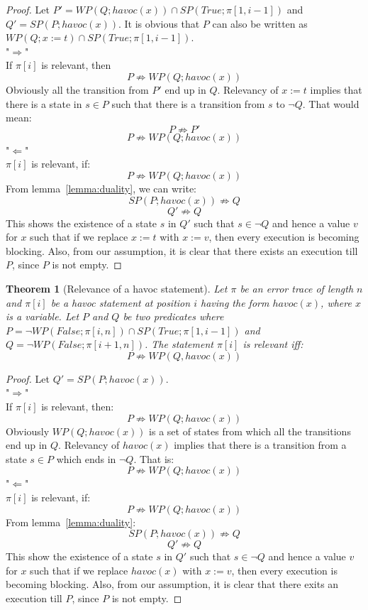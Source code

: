 \documentclass{article}
\newcommand{\limp}{\Rightarrow}
\newtheorem{theorem}{Theorem}
\begin{document}
\begin{proof}
Let $P' = WP(Q;havoc(x)) \cap SP(True; \pi[1,i-1])$ and $Q'=SP(P;havoc(x))$. It is obvious that $P$ can also be written as $WP(Q;x:=t) \cap SP(True; \pi[1,i-1])$.\\
"$\Rightarrow$"\\
If $\pi[i]$ is relevant, then\\
$$P \not \limp WP(Q;havoc(x))$$
Obviously all the transition from $P'$ end up in $Q$. Relevancy of $x:=t$ implies that there is a state in $s \in P$ such that there is a transition from $s$ to $\neg Q$. That would mean:
$$P \not \limp P'$$
$$P \not \limp WP(Q;havoc(x))$$
"$\Leftarrow$"\\
$\pi[i]$ is relevant, if:
$$P \not \limp WP(Q;havoc(x))$$
From lemma~\ref{lemma:duality}, we can write:
$$SP(P; havoc(x)) \not \limp Q$$
$$Q' \not \limp Q$$
This shows the existence of a state $s$ in $Q'$ such that $s\in \neg Q$ and hence a value $v$ for $x$ such that if we replace $x:=t$ with $x:=v$, then every execution is becoming blocking. Also, from our assumption, it is clear that there exists an execution till $P$, since $P$ is not empty.


\end{proof}

\newpage
\begin{theorem}[Relevance of a havoc statement]\label{mydef:relevancytheorem}
Let $\pi$ be an error trace of length $n$ and $\pi[i]$ be a havoc statement at position $i$ having the form $havoc(x)$, where $x$ is a variable. Let $P$ and $Q$ be two predicates where $P = \neg WP(False; \pi[i,n]) \cap SP(True; \pi[1,i-1])$ and $Q =  \neg WP(False; \pi[i+1,n])$. The statement $\pi[i]$ is relevant iff:
 $$P \not \limp WP(Q,havoc(x))$$
\end{theorem}

\begin{proof}
Let $Q'=SP(P;havoc(x))$.\\
"$\Rightarrow$"\\
If $\pi[i]$ is relevant, then:
$$P \not \limp WP(Q; havoc(x))$$
Obviously $WP(Q;havoc(x))$ is a set of states from which all the transitions end up in $Q$. Relevancy of $havoc(x)$ implies that there is a transition from a state $s \in P$ which ends in $\neg Q$. That is:
$$P \not \limp WP(Q;havoc(x))$$
"$\Leftarrow$" \\
$\pi[i]$ is relevant, if:
$$P \not \limp WP(Q; havoc(x))$$
From lemma~\ref{lemma:duality}:
$$SP(P; havoc(x)) \not \limp Q$$
$$Q' \not \limp Q$$
This show the existence of a state $s$ in $Q'$ such that $s \in \neg Q$ and hence a value $v$ for $x$ such that if we replace $havoc(x)$ with $x:=v$, then every execution is becoming blocking. Also, from our assumption, it is clear that there exits an execution till $P$, since $P$ is not empty.
\end{proof}
\end{document}
